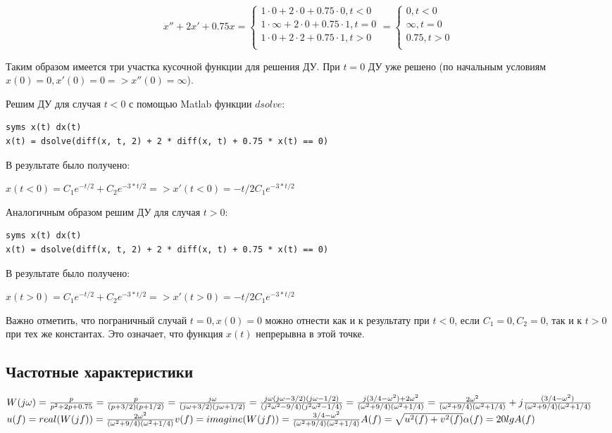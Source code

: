 \documentclass[14pt,a4paper,report]{report}
\begin{document}
\begin{equation*}
	\text{$x''+2x'+0.75x=$}
	\begin{cases}
		\text{$1\cdot0+2\cdot0+0.75\cdot0, t<0$} \\
		\text{$1\cdot\infty+2\cdot0+0.75\cdot1, t=0$} \\
		\text{$1\cdot0+2\cdot2+0.75\cdot1, t>0$} \\
	\end{cases}
	\text{$=$}
	\begin{cases}
		\text{$0, t<0$} \\
		\text{$\infty, t=0$} \\
		\text{$0.75, t>0$} \\
	\end{cases}
\end{equation*}

Таким образом имеется три участка кусочной функции для решения ДУ. При $t=0$ ДУ уже решено (по начальным условиям $x(0)=0, x'(0)=0 => x''(0)=\infty$).

Решим ДУ для случая $t<0$ с помощью Matlab функции $dsolve$:

\begin{lstlisting}
syms x(t) dx(t)
x(t) = dsolve(diff(x, t, 2) + 2 * diff(x, t) + 0.75 * x(t) == 0)
\end{lstlisting}

В результате было получено:

$x(t<0)=C_1e^{-t/2}+C_2e^{-3*t/2} => x'(t<0)=-t/2C_1e^{-3*t/2}$

Аналогичным образом решим ДУ для случая $t>0$:

\begin{lstlisting}
syms x(t) dx(t)
x(t) = dsolve(diff(x, t, 2) + 2 * diff(x, t) + 0.75 * x(t) == 0)
\end{lstlisting}

В результате было получено:

$x(t>0)=C_1e^{-t/2}+C_2e^{-3*t/2} => x'(t>0)=-t/2C_1e^{-3*t/2}$

Важно отметить, что пограничный случай $t=0, x(0)=0$ можно отнести как и к результату при $t<0$, если $C_1=0, C_2=0$, так и к $t>0$ при тех же константах. Это означает, что функция $x(t)$ непрерывна в этой точке.

\subsection{Частотные характеристики}

$
\\
W(j\omega)=\frac{p}{p^2+2p+0.75} = \frac{p}{(p+3/2)(p+1/2)} = \frac{j\omega}{(j\omega+3/2)(j\omega+1/2)} = \frac{j\omega(j\omega-3/2)(j\omega-1/2)}{(j^2\omega^2-9/4)(j^2\omega^2-1/4)}=\frac{j(3/4-\omega^2)+2\omega^2}{(\omega^2+9/4)(\omega^2+1/4)}=\frac{2\omega^2}{(\omega^2+9/4)(\omega^2+1/4)} + j\frac{(3/4-\omega^2)}{(\omega^2+9/4)(\omega^2+1/4)}$
$
\\
u(f)=real(W(jf))=\frac{2\omega^2}{(\omega^2+9/4)(\omega^2+1/4)}\\
v(f)=imagine(W(jf))=\frac{3/4-\omega^2}{(\omega^2+9/4)(\omega^2+1/4)}\\
A(f)=\sqrt{u^2(f) + v^2(f)}\\
\alpha(f)=20lgA(f)\\
$
\end{document}
